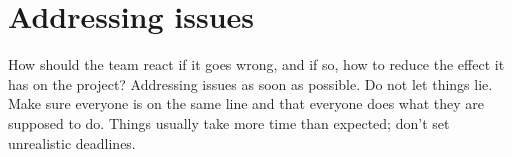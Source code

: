 \documentclass{article}
\begin{document}
\section*{Addressing issues}
How should the team react if it goes wrong, and if so, how to reduce the effect it has on the project?
\newline * Addressing issues as soon as possible. Do not let things lie.
\newline * Make sure everyone is on the same line and that everyone does what they are supposed to do.
\newline * Things usually take more time than expected; don’t set unrealistic deadlines.
\end{document}
